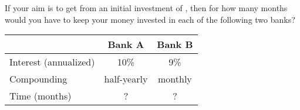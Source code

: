 
%
%
%
%
% 

\question[3]  If your aim is to get  from an initial investment
of , then for how many months would you have to keep
your money invested in each of the following two banks?
\begin{table}
	\begin{tabular}{lcc}
		\toprule
		& Bank A & Bank B \\
		\midrule
		Interest (annualized) & 10\% & 9\% \\
		Compounding & half-yearly & monthly \\
		Time (months) & ? & ? \\
		\bottomrule
	\end{tabular}
\end{table}


\ifprintanswers
\fi 

